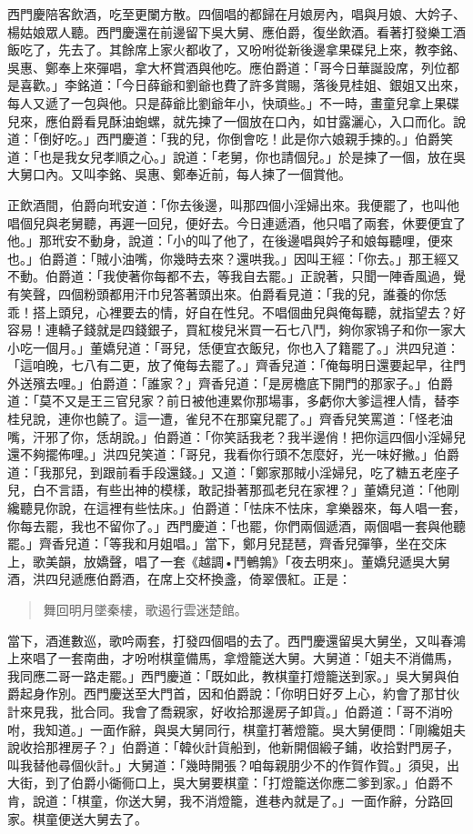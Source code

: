西門慶陪客飲酒，吃至更闌方散。四個唱的都歸在月娘房內，唱與月娘、大妗子、楊姑娘眾人聽。西門慶還在前邊留下吳大舅、應伯爵，復坐飲酒。看著打發樂工酒飯吃了，先去了。其餘席上家火都收了，又吩咐從新後邊拿果碟兒上來，教李銘、吳惠、鄭奉上來彈唱，拿大杯賞酒與他吃。應伯爵道：「哥今日華誕設席，列位都是喜歡。」李銘道：「今日薛爺和劉爺也費了許多賞賜，落後見桂姐、銀姐又出來，每人又遞了一包與他。只是薛爺比劉爺年小，快頑些。」不一時，畫童兒拿上果碟兒來，應伯爵看見酥油蚫螺，就先揀了一個放在口內，如甘露灑心，入口而化。說道：「倒好吃。」西門慶道：「我的兒，你倒會吃！此是你六娘親手揀的。」伯爵笑道：「也是我女兒孝順之心。」說道：「老舅，你也請個兒。」於是揀了一個，放在吳大舅口內。又叫李銘、吳惠、鄭奉近前，每人揀了一個賞他。

正飲酒間，伯爵向玳安道：「你去後邊，叫那四個小淫婦出來。我便罷了，也叫他唱個兒與老舅聽，再遲一回兒，便好去。今日連遞酒，他只唱了兩套，休要便宜了他。」那玳安不動身，說道：「小的叫了他了，在後邊唱與妗子和娘每聽哩，便來也。」伯爵道：「賊小油嘴，你幾時去來？還哄我。」因叫王經：「你去。」那王經又不動。伯爵道：「我使著你每都不去，等我自去罷。」正說著，只聞一陣香風過，覺有笑聲，四個粉頭都用汗巾兒答著頭出來。伯爵看見道：「我的兒，誰養的你恁乖！搭上頭兒，心裡要去的情，好自在性兒。不唱個曲兒與俺每聽，就指望去？好容易！連轎子錢就是四錢銀子，買紅梭兒米買一石七八鬥，夠你家鴇子和你一家大小吃一個月。」董嬌兒道：「哥兒，恁便宜衣飯兒，你也入了籍罷了。」洪四兒道：「這咱晚，七八有二更，放了俺每去罷了。」齊香兒道：「俺每明日還要起早，往門外送殯去哩。」伯爵道：「誰家？」齊香兒道：「是房檐底下開門的那家子。」伯爵道：「莫不又是王三官兒家？前日被他連累你那場事，多虧你大爹這裡人情，替李桂兒說，連你也饒了。這一遭，雀兒不在那窠兒罷了。」齊香兒笑罵道：「怪老油嘴，汗邪了你，恁胡說。」伯爵道：「你笑話我老？我半邊俏！把你這四個小淫婦兒還不夠擺佈哩。」洪四兒笑道：「哥兒，我看你行頭不怎麼好，光一味好撇。」伯爵道：「我那兒，到跟前看手段還錢。」又道：「鄭家那賊小淫婦兒，吃了糖五老座子兒，白不言語，有些出神的模樣，敢記掛著那孤老兒在家裡？」董嬌兒道：「他剛纔聽見你說，在這裡有些怯床。」伯爵道：「怯床不怯床，拿樂器來，每人唱一套，你每去罷，我也不留你了。」西門慶道：「也罷，你們兩個遞酒，兩個唱一套與他聽罷。」齊香兒道：「等我和月姐唱。」當下，鄭月兒琵琶，齊香兒彈箏，坐在交床上，歌美韻，放嬌聲，唱了一套《越調•鬥鵪鶉》「夜去明來」。董嬌兒遞吳大舅酒，洪四兒遞應伯爵酒，在席上交杯換盞，倚翠偎紅。正是：
\begin{quote}
舞回明月墜秦樓，歌遏行雲迷楚館。
\end{quote}

當下，酒進數巡，歌吟兩套，打發四個唱的去了。西門慶還留吳大舅坐，又叫春鴻上來唱了一套南曲，才吩咐棋童備馬，拿燈籠送大舅。大舅道：「姐夫不消備馬，我同應二哥一路走罷。」西門慶道：「既如此，教棋童打燈籠送到家。」吳大舅與伯爵起身作別。西門慶送至大門首，因和伯爵說：「你明日好歹上心，約會了那甘伙計來見我，批合同。我會了喬親家，好收拾那邊房子卸貨。」伯爵道：「哥不消吩咐，我知道。」一面作辭，與吳大舅同行，棋童打著燈籠。吳大舅便問：「剛纔姐夫說收拾那裡房子？」伯爵道：「韓伙計貨船到，他新開個緞子鋪，收拾對門房子，叫我替他尋個伙計。」大舅道：「幾時開張？咱每親朋少不的作賀作賀。」須臾，出大街，到了伯爵小衚衕口上，吳大舅要棋童：「打燈籠送你應二爹到家。」伯爵不肯，說道：「棋童，你送大舅，我不消燈籠，進巷內就是了。」一面作辭，分路回家。棋童便送大舅去了。

